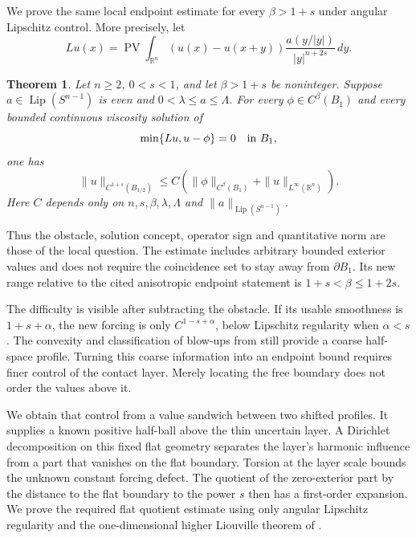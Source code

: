 \documentclass[11pt]{article}
\newtheorem{theorem}{Theorem}[section]
\numberwithin{equation}{section}
\newcommand{\R}{\mathbb R}
\newcommand{\Lip}{\operatorname{Lip}}
\newcommand{\PV}{\operatorname{PV}}
\begin{document}
We prove the same local endpoint estimate for every $\beta>1+s$ under
angular Lipschitz control. More precisely, let
\begin{equation}\label{eq:intro-operator}
 Lu(x)=\PV\int_{\R^n}(u(x)-u(x+y))
                   \frac{a(y/|y|)}{|y|^{n+2s}}\,dy.
\end{equation}

\begin{theorem}\label{thm:main}
Let $n\geq2$, $0<s<1$, and let $\beta>1+s$ be noninteger. Suppose
$a\in\Lip(S^{n-1})$ is even and $0<\lambda\leq a\leq\Lambda$.
For every $\phi\in C^\beta(B_1)$ and every bounded continuous viscosity
solution of
\[
                         \min\{Lu,u-\phi\}=0\quad\hbox{in }B_1,
\]
one has
\begin{equation}\label{eq:main-estimate}
 \|u\|_{C^{1+s}(B_{1/2})}
       \leq C\left(\|\phi\|_{C^\beta(B_1)}+
                                  \|u\|_{L^\infty(\R^n)}\right).
\end{equation}
Here $C$ depends only on $n,s,\beta,\lambda,\Lambda$ and
$\|a\|_{\Lip(S^{n-1})}$.
\end{theorem}

Thus the obstacle, solution concept, operator sign and quantitative norm
are those of the local question. The estimate includes arbitrary bounded
exterior values and does not require the coincidence set to stay away from
$\partial B_1$. Its new range relative to the cited anisotropic endpoint
statement is $1+s<\beta\leq1+2s$.

The difficulty is visible after subtracting the obstacle. If its usable
smoothness is $1+s+\alpha$, the new forcing is only
$C^{1-s+\alpha}$, below Lipschitz regularity when $\alpha<s$.
The convexity and classification of blow-ups from \cite[Theorem 1.5]{RTW}
still provide a coarse half-space profile. Turning this coarse information
into an endpoint bound requires finer control of the contact layer. Merely
locating the free boundary does not order the values above it.

We obtain that control from a value sandwich between two shifted profiles.
It supplies a known positive half-ball above the thin uncertain layer. A
Dirichlet decomposition on this fixed flat geometry separates the layer's
harmonic influence from a part that vanishes on the flat boundary. Torsion
at the layer scale bounds the unknown constant forcing defect. The quotient
of the zero-exterior part by the distance to the flat boundary to the power
$s$ then has a first-order expansion. We prove the required flat quotient
estimate using only angular Lipschitz regularity and the one-dimensional
higher Liouville theorem of \cite[Proposition 3.11]{AR}.
\end{document}
